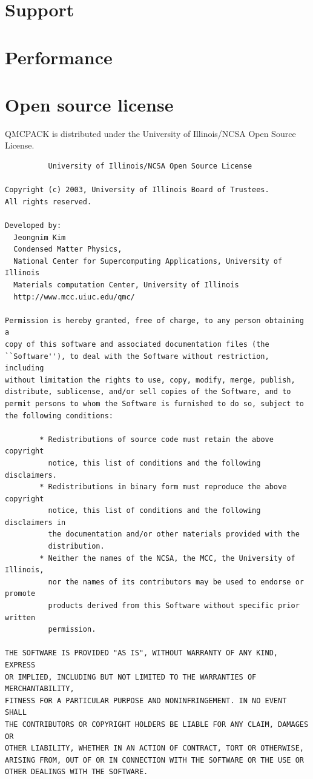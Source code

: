 \section{Support}
\label{sec:support}

\section{Performance}
\label{sec:performance}

\section{Open source license}
\label{sec:license}

QMCPACK is distributed under the University of Illinois/NCSA Open
Source License. 

\begin{verbatim}
		  University of Illinois/NCSA Open Source License

Copyright (c) 2003, University of Illinois Board of Trustees.
All rights reserved.

Developed by:   
  Jeongnim Kim
  Condensed Matter Physics,
  National Center for Supercomputing Applications, University of Illinois
  Materials computation Center, University of Illinois
  http://www.mcc.uiuc.edu/qmc/

Permission is hereby granted, free of charge, to any person obtaining a
copy of this software and associated documentation files (the
``Software''), to deal with the Software without restriction, including
without limitation the rights to use, copy, modify, merge, publish,
distribute, sublicense, and/or sell copies of the Software, and to
permit persons to whom the Software is furnished to do so, subject to
the following conditions:

        * Redistributions of source code must retain the above copyright 
          notice, this list of conditions and the following disclaimers.
        * Redistributions in binary form must reproduce the above copyright 
          notice, this list of conditions and the following disclaimers in 
          the documentation and/or other materials provided with the 
          distribution.
        * Neither the names of the NCSA, the MCC, the University of Illinois, 
          nor the names of its contributors may be used to endorse or promote 
          products derived from this Software without specific prior written 
          permission.

THE SOFTWARE IS PROVIDED "AS IS", WITHOUT WARRANTY OF ANY KIND, EXPRESS
OR IMPLIED, INCLUDING BUT NOT LIMITED TO THE WARRANTIES OF MERCHANTABILITY, 
FITNESS FOR A PARTICULAR PURPOSE AND NONINFRINGEMENT. IN NO EVENT SHALL 
THE CONTRIBUTORS OR COPYRIGHT HOLDERS BE LIABLE FOR ANY CLAIM, DAMAGES OR 
OTHER LIABILITY, WHETHER IN AN ACTION OF CONTRACT, TORT OR OTHERWISE, 
ARISING FROM, OUT OF OR IN CONNECTION WITH THE SOFTWARE OR THE USE OR 
OTHER DEALINGS WITH THE SOFTWARE.

\end{verbatim}

